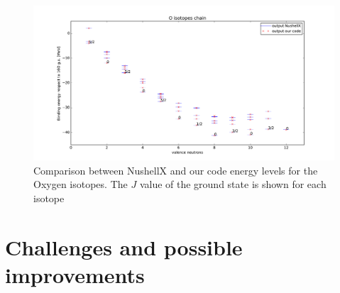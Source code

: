 \documentclass[twoside]{article}
\begin{document}
\begin{figure}[ht]
\centering
\includegraphics[width=1.\textwidth]{isotopes.pdf}
\caption{Comparison between NushellX and our code energy levels for the Oxygen isotopes. The $J$ value of the ground state is shown for each isotope}
\label{fig: isotopes}
\end{figure}





\newpage

\section{Challenges and possible improvements}
\label{sec:discussion}

\end{document}
